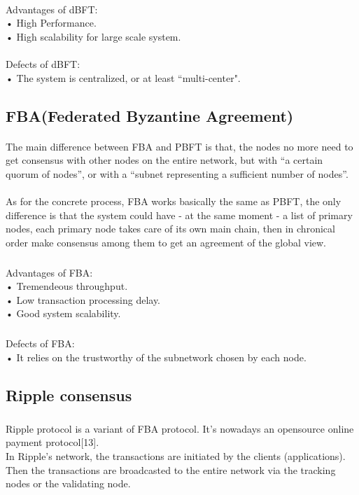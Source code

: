 \documentclass[doublespacing]{bmcart}
\begin{document}
\begin{CJK*}{UTF8}{gbsn}
	\paragraph{} 
Advantages of dBFT:
\\• High Performance.
\\• High scalability for large scale system.
	\paragraph{} 
Defects of dBFT:	
\\• The system is centralized, or at least ``multi-center".
	
	\subsection{FBA(Federated Byzantine Agreement)}
	\paragraph{} 
	The main difference between FBA and PBFT is that, the nodes no more need to get consensus with other nodes on the entire network, but with ``a certain quorum of nodes'', or with a ``subnet representing a sufficient number of nodes''.
	
	\paragraph{} 
	As for the concrete process, FBA works basically the same as PBFT, the only difference is that the system could have - at the same moment - a list of primary nodes, each primary node takes care of its own main chain, then in chronical order make consensus among them to get an agreement of the global view.
	
	\subparagraph{} 
Advantages of FBA:
\\• Tremendeous throughput.
\\• Low transaction processing delay.
\\• Good system scalability.
	\subparagraph{} 
Defects of FBA:	
\\• It relies on the trustworthy of the subnetwork chosen by each node.
	
	\subsection{Ripple consensus}
	\subparagraph{}  
	Ripple protocol is a variant of FBA protocol. It's nowadays an opensource online payment protocol[13].
	\\
	In Ripple's network, the transactions are initiated by the clients (applications). Then the transactions are broadcasted to the entire network via the tracking nodes or the validating node.


\end{CJK*}
\end{document}

